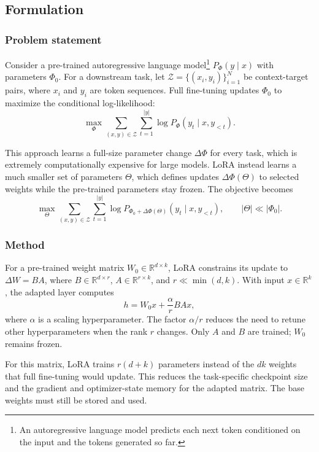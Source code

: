 \subsection{Formulation}

\subsubsection{Problem statement}

Consider a pre-trained autoregressive language model\footnote{An autoregressive language model predicts each next token conditioned on the input and the tokens generated so far.} $P_{\Phi}(y\mid x)$ with parameters $\Phi_0$. For a downstream task, let $\mathcal{Z}=\{(x_i,y_i)\}_{i=1}^{N}$ be context-target pairs, where $x_i$ and $y_i$ are token sequences. Full fine-tuning updates $\Phi_0$ to maximize the conditional log-likelihood:
\[
\max_{\Phi}
\sum_{(x,y)\in\mathcal{Z}}
\sum_{t=1}^{|y|}
\log P_{\Phi}(y_t\mid x,y_{<t}).
\]

This approach learns a full-size parameter change $\Delta\Phi$ for every task, which is extremely computationally expensive for large models. LoRA instead learns a much smaller set of parameters $\Theta$, which defines updates $\Delta\Phi(\Theta)$ to selected weights while the pre-trained parameters stay frozen. The objective becomes
\[
\max_{\Theta}
\sum_{(x,y)\in\mathcal{Z}}
\sum_{t=1}^{|y|}
\log P_{\Phi_0+\Delta\Phi(\Theta)}(y_t\mid x,y_{<t}),
\qquad |\Theta|\ll|\Phi_0|.
\]

\subsubsection{Method}

For a pre-trained weight matrix $W_0\in\mathbb{R}^{d\times k}$, LoRA constrains its update to $\Delta W=BA$, where $B\in\mathbb{R}^{d\times r}$, $A\in\mathbb{R}^{r\times k}$, and $r\ll\min(d,k)$. With input $x\in\mathbb{R}^{k}$, the adapted layer computes
\[
h=W_0x+\frac{\alpha}{r}BAx,
\]
where $\alpha$ is a scaling hyperparameter. The factor $\alpha/r$ reduces the need to retune other hyperparameters when the rank $r$ changes. Only $A$ and $B$ are trained; $W_0$ remains frozen.

For this matrix, LoRA trains $r(d+k)$ parameters instead of the $dk$ weights that full fine-tuning would update. This reduces the task-specific checkpoint size and the gradient and optimizer-state memory for the adapted matrix. The base weights must still be stored and used.

